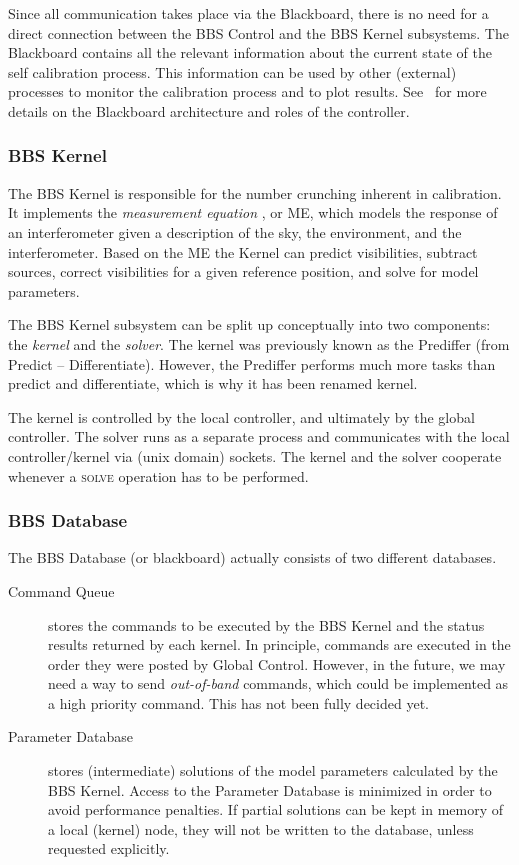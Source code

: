 \documentclass[10pt]{lofar}
\newcommand{\solve}{\textsc{solve}\xspace}
\begin{document}
Since all communication takes place via the Blackboard, there is no need for
a direct connection between the BBS Control and the BBS Kernel subsystems.
The Blackboard contains all the relevant information about the current state
of the self calibration process. This information can be used by other
(external) processes to monitor the calibration process and to plot results.
See~\cite{LOFAR-ASTRON-SDD-002} for more details on the Blackboard
architecture and roles of the controller.

\subsubsection{BBS Kernel}
\label{subsubsec:sys-kernel}

The BBS Kernel is responsible for the number crunching inherent in calibration.
It implements the \emph{measurement equation} \cite{Hamaker1996-1,
aips++note185}, or ME, which models the response of an interferometer given a
description of the sky, the environment, and the interferometer. Based on the ME
the Kernel can predict visibilities, subtract sources, correct visibilities for
a given reference position, and solve for model parameters.

The BBS Kernel subsystem can be split up conceptually into two components: the
\emph{kernel} and the \emph{solver}. The kernel was previously known as the
Prediffer (from Predict -- Differentiate). However, the Prediffer performs much
more tasks than predict and differentiate, which is why it has been renamed
kernel.

The kernel is controlled by the local controller, and ultimately by the global
controller. The solver runs as a separate process and communicates with the
local controller/kernel via (unix domain) sockets. The kernel and the solver
cooperate whenever a \solve operation has to be performed.

\subsubsection{BBS Database}
\label{subsubsec:sys-database}
The BBS Database (or blackboard) actually consists of two different databases.

\begin{description}
\item [Command Queue] stores the commands to be executed by the BBS Kernel and
the status results returned by each kernel. In principle, commands are executed
in the order they were posted by Global Control. However, in the future, we may
need a way to send \emph{out-of-band} commands, which could be implemented as a
high priority command. This has not been fully decided yet.
\item [Parameter Database] stores (intermediate) solutions of the model
parameters calculated by the BBS Kernel. Access to the Parameter Database is
minimized in order to avoid performance penalties. If partial solutions can be
kept in memory of a local (kernel) node, they will not be written to the
database, unless requested explicitly.
\end{description}
\end{document}
